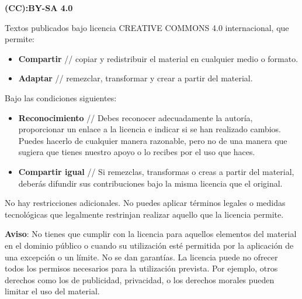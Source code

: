 
\thispagestyle{empty}\sffamily
\begin{flushleft}\scriptsize

\textbf{(CC):BY-SA 4.0}

\vspace{.5\baselineskip}

Textos publicados bajo licencia CREATIVE COMMONS 4.0 internacional, que permite:

\begin{itemize}
\item \textbf{Compartir} // copiar y redistribuir el material en cualquier medio o formato.
\item \textbf{Adaptar} // remezclar, transformar y crear a partir del material.
\end{itemize}

Bajo las condiciones siguientes:

\begin{itemize}
\item \textbf{Reconocimiento} // Debes reconocer adecuadamente la autoría, proporcionar un enlace a la licencia e indicar si se han realizado cambios. Puedes hacerlo de cualquier manera razonable, pero no de una manera que sugiera que tienes nuestro apoyo o lo recibes por el uso que haces.
\item \textbf{Compartir igual} // Si remezclas, transformas o creas a partir del material, deberás difundir sus contribuciones bajo la misma licencia que el original.
\end{itemize}

No hay restricciones adicionales. No puedes aplicar términos legales o medidas tecnológicas que legalmente restrinjan realizar aquello que la licencia permite.

\vspace{1.0\baselineskip}

\textbf{Aviso}: No tienes que cumplir con la licencia para aquellos elementos del material en el dominio público o cuando su utilización esté permitida por la aplicación de una excepción o un límite. No se dan garantías. La licencia puede no ofrecer todos los permisos necesarios para la utilización prevista. Por ejemplo, otros derechos como los de publicidad, privacidad, o los derechos morales pueden limitar el uso del material.

\vspace{1.0\baselineskip}


\end{flushleft}
